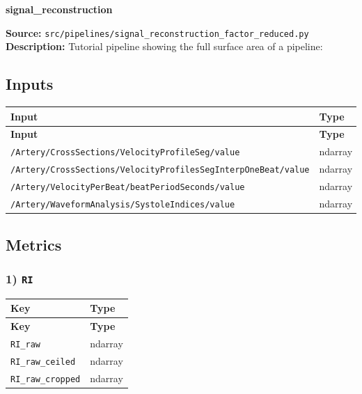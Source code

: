 \documentclass[11pt]{article}
\begin{document}
\begin{center}
\LARGE\textbf{signal\_reconstruction}
\end{center}
\textbf{Source:} \texttt{src/\allowbreak{}pipelines/\allowbreak{}signal\_\allowbreak{}reconstruction\_\allowbreak{}factor\_\allowbreak{}reduced.py}\\
\textbf{Description:} Tutorial pipeline showing the full surface area of a pipeline:

\subsection*{Inputs}
\begin{longtable}{|p{}|p{}|}
\hline
\textbf{Input} & \textbf{Type} \\ \hline
\endfirsthead
\hline
\textbf{Input} & \textbf{Type} \\ \hline
\endhead
{\scriptsize \texttt{/\allowbreak{}Artery/\allowbreak{}CrossSections/\allowbreak{}VelocityProfileSeg/\allowbreak{}value}} & ndarray \\ \hline
{\scriptsize \texttt{/\allowbreak{}Artery/\allowbreak{}CrossSections/\allowbreak{}VelocityProfilesSegInterpOneBeat/\allowbreak{}value}} & ndarray \\ \hline
{\scriptsize \texttt{/\allowbreak{}Artery/\allowbreak{}VelocityPerBeat/\allowbreak{}beatPeriodSeconds/\allowbreak{}value}} & ndarray \\ \hline
{\scriptsize \texttt{/\allowbreak{}Artery/\allowbreak{}WaveformAnalysis/\allowbreak{}SystoleIndices/\allowbreak{}value}} & ndarray \\ \hline
\end{longtable}

\subsection*{Metrics}
\subsubsection*{1) \texttt{RI}}
\begin{longtable}{|p{}|p{}|}
\hline
\textbf{Key} & \textbf{Type} \\ \hline
\endfirsthead
\hline
\textbf{Key} & \textbf{Type} \\ \hline
\endhead
\texttt{RI\_\allowbreak{}raw} & ndarray \\ \hline
\texttt{RI\_\allowbreak{}raw\_\allowbreak{}ceiled} & ndarray \\ \hline
\texttt{RI\_\allowbreak{}raw\_\allowbreak{}cropped} & ndarray \\ \hline
\end{longtable}
\end{document}
